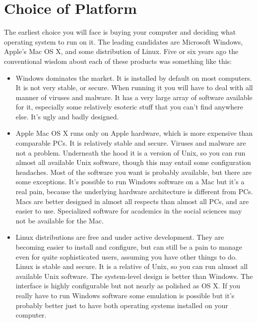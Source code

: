 \documentclass[11pt,article,oneside]{memoir}
\begin{document}
\chapter{Choice of Platform}

The earliest choice you will face is buying your computer and deciding what operating system to run on it. The leading candidates are Microsoft Windows, Apple's Mac OS X, and some distribution of Linux. Five or six years ago the conventional wisdom about each of these products was something like this:  
                                                                                      
\begin{itemize}
	\item Windows dominates the market. It is installed by default on most computers. It is not very stable, or secure. When running it you will have to deal with all manner of viruses and malware. It has a very large array of software available for it, especially some relatively esoteric stuff that you can't find anywhere else. It's ugly and badly designed. 
	\item Apple Mac OS X runs only on Apple hardware, which is more expensive than comparable PCs. It is relatively stable and secure. Viruses and malware are not a problem. Underneath the hood it is a version of Unix, so you can run almost all available Unix software, though this may entail some configuration headaches. Most of the software you want is probably available, but there are some exceptions. It's possible to run Windows software on a Mac but it's a real pain, because the underlying hardware architecture is different from PCs. Macs are better designed in almost all respects than almost all PCs, and are easier to use. Specialized software for academics in the social sciences may not be available for the Mac. 
	\item Linux distributions are free and under active development. They are becoming easier to install and configure, but can still be a pain to manage even for quite sophisticated users, assuming you have other things to do. Linux is stable and secure. It is a relative of Unix, so you can run almost all available Unix software. The system-level design is better than Windows. The interface is highly configurable but not nearly as polished as OS X. If you really have to run Windows software some emulation is possible but it's probably better just to have both operating systems installed on your computer. 
\end{itemize}
\end{document}
